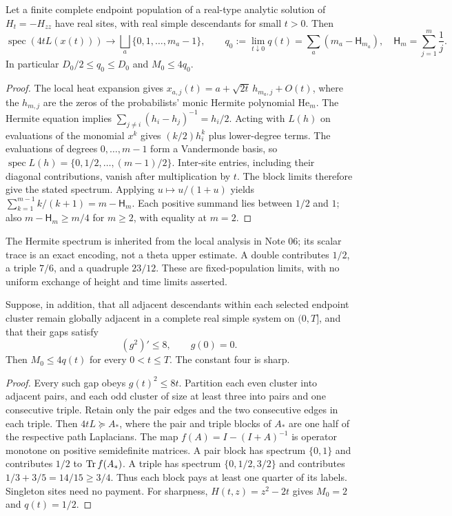 \begin{proposition}
\label{prop:endpoint-spectrum}
Let a finite complete endpoint population of a real-type analytic solution of
$H_t=-H_{zz}$ have real sites, with real simple descendants for small $t>0$.
Then
\[
 \operatorname{spec}(4tL(x(t)))\longrightarrow
 \bigsqcup_a\{0,1,\ldots,m_a-1\},
 \qquad
 q_0:=\lim_{t\downarrow0}q(t)=\sum_a(m_a-\mathsf H_{m_a}),
 \quad \mathsf H_m=\sum_{j=1}^m\frac1j.
\]
In particular $D_0/2\le q_0\le D_0$ and $M_0\le4q_0$.
\end{proposition}
\begin{proof}
The local heat expansion gives
$x_{a,j}(t)=a+\sqrt{2t}\,h_{m_a,j}+O(t)$, where the $h_{m,j}$ are the
zeros of the probabilists' monic Hermite polynomial $\mathrm{He}_m$.
The Hermite equation implies
$\sum_{j\ne i}(h_i-h_j)^{-1}=h_i/2$.
Acting with $L(h)$ on evaluations of the monomial $x^k$ gives
$(k/2)h_i^k$ plus lower-degree terms. The evaluations of degrees
$0,\ldots,m-1$ form a Vandermonde basis, so
$\operatorname{spec}L(h)=\{0,1/2,\ldots,(m-1)/2\}$.
Inter-site entries, including their diagonal contributions, vanish after
multiplication by $t$. The block limits therefore give the stated spectrum.
Applying $u\mapsto u/(1+u)$ yields
$\sum_{k=1}^{m-1}k/(k+1)=m-\mathsf H_m$.
Each positive summand lies between $1/2$ and $1$; also
$m-\mathsf H_m\ge m/4$ for $m\ge2$, with equality at $m=2$.
\end{proof}

The Hermite spectrum is inherited from the local analysis in Note 06; its
scalar trace is an exact encoding, not a theta upper estimate. A double
contributes $1/2$, a triple $7/6$, and a quadruple $23/12$.
These are fixed-population limits, with no uniform exchange of height and
time limits asserted.

\begin{theorem}
\label{thm:sharp-transfer}
Suppose, in addition, that all adjacent descendants within each selected
endpoint cluster remain globally adjacent in a complete real simple system
on $(0,T]$, and that their gaps satisfy
\[
 (g^2)'\le8,\qquad g(0)=0.
\]
Then $M_0\le4q(t)$ for every $0<t\le T$. The constant four is sharp.
\end{theorem}
\begin{proof}
Every such gap obeys $g(t)^2\le8t$. Partition each even cluster into adjacent
pairs, and each odd cluster of size at least three into pairs and one
consecutive triple. Retain only the pair edges and the two consecutive edges
in each triple. Then $4tL\succeq A_*$, where the pair and triple blocks of
$A_*$ are one half of the respective path Laplacians.
The map $f(A)=I-(I+A)^{-1}$ is operator monotone on positive semidefinite
matrices. A pair block has spectrum $\{0,1\}$ and contributes $1/2$ to
$\operatorname{Tr} f(A_*)$. A triple has spectrum $\{0,1/2,3/2\}$ and contributes
$1/3+3/5=14/15\ge3/4$. Thus each block pays at least one quarter of its
labels. Singleton sites need no payment. For sharpness,
$H(t,z)=z^2-2t$ gives $M_0=2$ and $q(t)=1/2$.
\end{proof}

